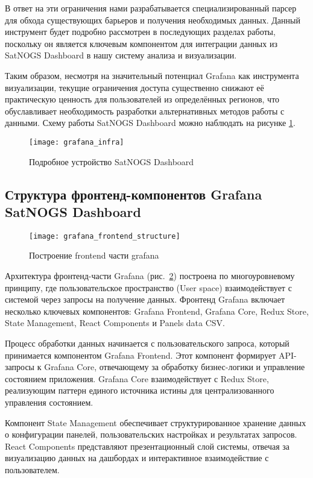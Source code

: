В ответ на эти ограничения нами разрабатывается специализированный парсер для
обхода существующих барьеров и получения необходимых данных. Данный инструмент
будет подробно рассмотрен в последующих разделах работы, поскольку он является
ключевым компонентом для интеграции данных из SatNOGS Dashboard в нашу систему
анализа и визуализации.

Таким образом, несмотря на значительный потенциал Grafana как инструмента
визуализации, текущие ограничения доступа существенно снижают её практическую
ценность для пользователей из определённых регионов, что обуславливает
необходимость разработки альтернативных методов работы с данными.
Схему работы SatNOGS Dashboard можно наблюдать на рисунке
\ref{fig:grafana_infra}.

\begin{figure}[htbp]
	\centering
	\texttt{[image: grafana\_infra]}
	\caption{Подробное устройство SatNOGS Dashboard}
	\label{fig:grafana_infra}
\end{figure}

\subsection{Структура фронтенд-компонентов Grafana SatNOGS Dashboard}

\begin{figure}[htbp]
	\centering
	\texttt{[image: grafana\_frontend\_structure]}
	\caption{Построение frontend части grafana \cite{react_managing_state}}
	\label{fig:grafana_frontend_structure}
\end{figure}

Архитектура фронтенд-части Grafana
(рис.~\ref{fig:grafana_frontend_structure})
построена по многоуровневому принципу, где пользовательское пространство (User
space) взаимодействует с системой через запросы на получение данных. Фронтенд
Grafana включает несколько ключевых компонентов: Grafana Frontend, Grafana
Core, Redux Store, State Management, React Components и Panels data CSV.

Процесс обработки данных начинается с пользовательского запроса, который
принимается компонентом Grafana Frontend. Этот компонент формирует API-запросы
к Grafana Core, отвечающему за обработку бизнес-логики и управление состоянием
приложения. Grafana Core взаимодействует с Redux Store, реализующим паттерн
единого источника истины для централизованного управления состоянием.

Компонент State Management обеспечивает структурированное хранение данных о
конфигурации панелей, пользовательских настройках и результатах запросов. React
Components представляют презентационный слой системы, отвечая за визуализацию
данных на дашбордах и интерактивное взаимодействие с пользователем.

